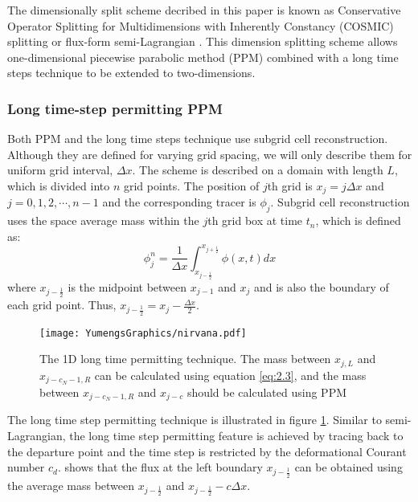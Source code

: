 The dimensionally split scheme decribed in this paper is known as Conservative Operator Splitting for Multidimensions with Inherently Constancy (COSMIC) splitting \citep{Leonard1996} or flux-form semi-Lagrangian \citep{Lin1996}. This dimension splitting scheme allows one-dimensional piecewise parabolic method (PPM) \citep{Colella1984} combined with a long time steps technique \citep{Leonard1995} to be extended to two-dimensions.
\subsubsection{Long time-step permitting PPM} 
\label{sec:PPM}
Both PPM and the long time steps technique use subgrid cell reconstruction. Although they are defined for varying grid spacing, we will only describe them for uniform grid interval, $\Delta x$. The scheme is described on a domain with length $L$, which is divided into $n$ grid points. The position of $j$th grid is $x_j = j\Delta x$ and $j = 0, 1, 2, \cdots, n-1$ and the corresponding tracer is $\phi_j$. Subgrid cell reconstruction uses the space average mass within the $j$th grid box at time $t_n$, which is defined as: 
\begin{equation} \label{eq:2.1} 
\phi^n_j = \frac{1}{\Delta x} \int^{x_{j+\frac{1}{2}}}_{x_{j-\frac{1}{2}}} \phi (x,t)dx
\end{equation}
where $x_{j-\frac{1}{2}}$ is the midpoint between $x_{j-1}$ and $x_{j}$ and is also the boundary of each grid point. Thus, $x_{j-\frac{1}{2}} = x_j - \frac{\Delta x}{2}$.
\begin{figure}
\centering
\texttt{[image: YumengsGraphics/nirvana.pdf]}
\caption{The 1D long time permitting technique. The mass between $x_{j,L}$ and $x_{j-c_N-1,R}$ can be calculated using equation \ref{eq:2.3}, and the mass between $x_{j-c_N-1,R}$ and $x_{j-c}$ should be calculated using PPM \label{fig:2.1}}
\end{figure}

The long time step permitting technique is illustrated in figure \ref{fig:2.1}. Similar to semi-Lagrangian, the long time step permitting feature is achieved by tracing back to the departure point and the time step is restricted by the deformational Courant number $c_d$. \cite{Leonard1995} shows that the flux at the left boundary $x_{j-\frac{1}{2}}$ can be obtained using the average mass between $x_{j-\frac{1}{2}}$ and $x_{j-\frac{1}{2}}-c\Delta x$.


